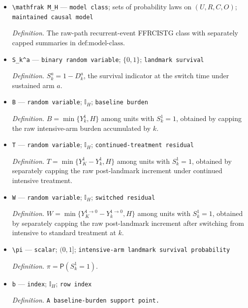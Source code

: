 \documentclass{article}
\begin{document}
\begin{itemize}
  \par\smallskip\noindent\emph{Definition.} \texttt{The joint law of the response tree,\allowbreak{} assignment,\allowbreak{} censoring,\allowbreak{} and observed history.}
  \item \texttt{\textbackslash{}\allowbreak{}mathfrak M\_\allowbreak{}H} --- \texttt{model class}; sets of probability laws on \((U,R,C,O)\); \texttt{maintained causal model}
  \par\smallskip\noindent\emph{Definition.} The raw-path recurrent-event FFRCISTG class with separately capped summaries in \(\text{def:model-class}\).
  \item \texttt{S\_\allowbreak{}k\textasciicircum{}a} --- \texttt{binary random variable}; \(\{0,1\}\); \texttt{landmark survival}
  \par\smallskip\noindent\emph{Definition.} \(S_k^a=1-D_k^a\), the survival indicator at the switch time under sustained arm \(a\).
  \item \texttt{B} --- \texttt{random variable}; \(\mathbb I_H\); \texttt{baseline burden}
  \par\smallskip\noindent\emph{Definition.} \(B=\min\{Y_k^1,H\}\) among units with \(S_k^1=1\), obtained by capping the raw intensive-arm burden accumulated by \(k\).
  \item \texttt{T} --- \texttt{random variable}; \(\mathbb I_H\); \texttt{continued-\allowbreak{}treatment residual}
  \par\smallskip\noindent\emph{Definition.} \(T=\min\{Y_K^1-Y_k^1,H\}\) among units with \(S_k^1=1\), obtained by separately capping the raw post-landmark increment under continued intensive treatment.
  \item \texttt{W} --- \texttt{random variable}; \(\mathbb I_H\); \texttt{switched residual}
  \par\smallskip\noindent\emph{Definition.} \(W=\min\{Y_K^{1\to0}-Y_k^{1\to0},H\}\) among units with \(S_k^1=1\), obtained by separately capping the raw post-landmark increment after switching from intensive to standard treatment at \(k\).
  \item \texttt{\textbackslash{}\allowbreak{}pi} --- \texttt{scalar}; \((0,1]\); \texttt{intensive-\allowbreak{}arm landmark survival probability}
  \par\smallskip\noindent\emph{Definition.} \(\pi=\mathsf P(S_k^1=1)\).
  \item \texttt{b} --- \texttt{index}; \(\mathbb I_H\); \texttt{row index}
  \par\smallskip\noindent\emph{Definition.} \texttt{A baseline-\allowbreak{}burden support point.}

\end{itemize}
\end{document}
